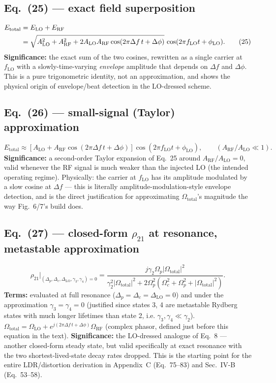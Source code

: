 \documentclass[11pt]{article}
\begin{document}
\subsection*{Eq.~(25) --- exact field superposition}
\begin{align}
E_\text{total} &=E_\text{LO}+E_\text{RF} \notag\\
&=\sqrt{A_\text{LO}^2+A_\text{RF}^2+2A_\text{LO}A_\text{RF}\cos(2\pi\Delta f\,t+\Delta\phi)}\,\cos(2\pi f_\text{LO}t+\phi_\text{LO}). \tag{25}
\end{align}
\textbf{Significance:} the exact sum of the two cosines, rewritten as a
single carrier at $f_\text{LO}$ with a slowly-time-varying \emph{envelope}
amplitude that depends on $\Delta f$ and $\Delta\phi$. This is a pure
trigonometric identity, not an approximation, and shows the physical
origin of envelope/beat detection in the LO-dressed scheme.

\subsection*{Eq.~(26) --- small-signal (Taylor) approximation}
\begin{equation}
E_\text{total} \approx [A_\text{LO}+A_\text{RF}\cos(2\pi\Delta f\,t+\Delta\phi)]\cos(2\pi f_\text{LO}t+\phi_\text{LO}), \qquad (A_\text{RF}/A_\text{LO}\ll1). \tag{26}
\end{equation}
\textbf{Significance:} a second-order Taylor expansion of Eq.~25 around
$A_\text{RF}/A_\text{LO}=0$, valid whenever the RF signal is much weaker
than the injected LO (the intended operating regime). Physically: the
carrier at $f_\text{LO}$ has its amplitude modulated by a slow cosine at
$\Delta f$ --- this is literally amplitude-modulation-style envelope
detection, and is the direct justification for approximating
$\Omega_\text{total}$'s magnitude the way Fig.~6/7's build does.

\subsection*{Eq.~(27) --- closed-form $\rho_{21}$ at resonance, metastable approximation}
\begin{equation}
\rho_{21}\big|_{(\Delta_p,\Delta_c,\Delta_\text{LO},\gamma_3,\gamma_4)=0}
= \frac{j\gamma_2\Omega_p|\Omega_\text{total}|^2}{\gamma_2^2|\Omega_\text{total}|^2+2\Omega_p^2\left(\Omega_c^2+\Omega_p^2+|\Omega_\text{total}|^2\right)}. \tag{27}
\end{equation}
\textbf{Terms:} evaluated at full resonance
($\Delta_p=\Delta_c=\Delta_\text{LO}=0$) and under the approximation
$\gamma_3=\gamma_4=0$ (justified since states 3, 4 are metastable
Rydberg states with much longer lifetimes than state 2, i.e.
$\gamma_3,\gamma_4\ll\gamma_2$). $\Omega_\text{total}=\Omega_\text{LO}+e^{j(2\pi\Delta f\,t+\Delta\phi)}\Omega_\text{RF}$
(complex phasor, defined just before this equation in the text).
\textbf{Significance:} the LO-dressed analogue of Eq.~8 --- another
closed-form steady state, but valid specifically at exact resonance
with the two shortest-lived-state decay rates dropped. This is the
starting point for the entire LDR/distortion derivation in Appendix~C
(Eq.~75--83) and Sec.~IV-B (Eq.~53--58).
\end{document}
